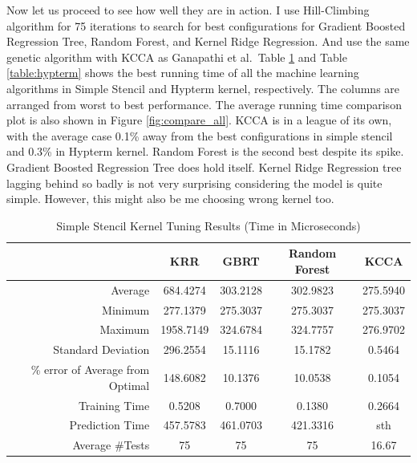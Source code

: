 Now let us proceed to see how well they are in action. I use Hill-Climbing algorithm for 75 iterations to search for best configurations for Gradient Boosted Regression Tree, Random Forest, and Kernel Ridge Regression. And use the same genetic algorithm with KCCA as Ganapathi et al.\ Table \ref{table:simple} and Table \ref{table:hypterm} shows the best running time of all the machine learning algorithms in Simple Stencil and Hypterm kernel, respectively. The columns are arranged from worst to best performance. The average running time comparison plot is also shown in Figure \ref{fig:compare_all}. KCCA is in a league of its own, with the average case 0.1\% away from the best configurations in simple stencil and 0.3\% in Hypterm kernel. Random Forest is the second best despite its spike. Gradient Boosted Regression Tree does hold itself. Kernel Ridge Regression tree lagging behind so badly is not very surprising considering the model is quite simple. However, this might also be me choosing wrong kernel too.

\begin{table}[ht]
\caption{Simple Stencil Kernel Tuning Results (Time in Microseconds)}
\center
\begin{tabular}{r c c c c}
\hline
 & KRR	& GBRT	& Random Forest	& KCCA \\
\hline\hline
Average	& 684.4274	& 303.2128	& 302.9823	& 275.5940 \\
Minimum	& 277.1379	& 275.3037	& 275.3037	& 275.3037 \\
Maximum	& 1958.7149	& 324.6784	& 324.7757	& 276.9702 \\
Standard Deviation	& 296.2554	& 15.1116	& 15.1782	& 0.5464 \\
\% error of Average from Optimal	& 148.6082	& 10.1376	& 10.0538	& 0.1054 \\
\cline{2-5}
Training Time & 0.5208 & 0.7000 & 0.1380 & 0.2664 \\
Prediction Time & 457.5783 & 461.0703 & 421.3316 & sth \\
Average \#Tests & 75 & 75 & 75 & 16.67 \\
\hline
\end{tabular}
\label{table:simple}
\end{table}

